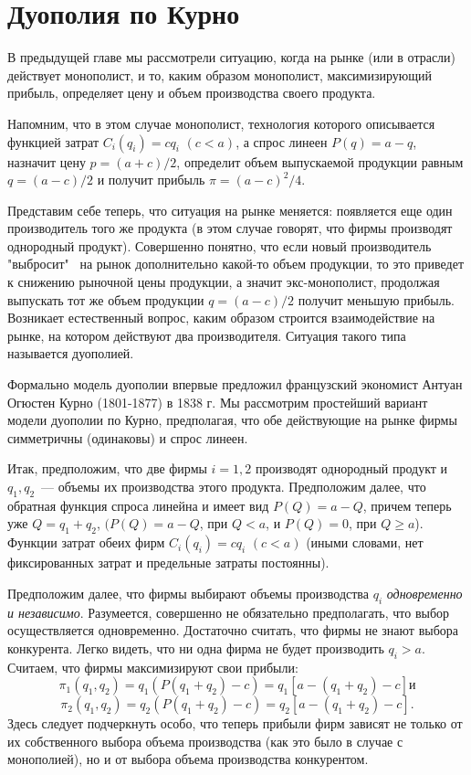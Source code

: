 \section{Дуополия по Курно}

В предыдущей главе мы рассмотрели ситуацию, когда на рынке (или в
отрасли) действует монополист, и то, каким образом монополист,
максимизирующий прибыль, определяет цену и объем
производства своего продукта.

Напомним, что в этом случае монополист, технология которого
описывается функцией затрат $C_i(q_i)=cq_i$ $(c<a)$, а спрос линеен
$P(q)=a-q$, назначит цену $p=(a+c)/2$, определит объем выпускаемой
продукции равным $q=(a-c)/2$ и получит прибыль $\pi = (a-c)^2/4$.

Представим себе теперь, что ситуация на рынке меняется: появляется
еще один производитель того же продукта (в этом случае говорят, что
фирмы производят однородный продукт). Совершенно понятно, что если
новый производитель "выбросит" \, на рынок дополнительно какой-то объем
продукции, то это приведет к снижению рыночной цены продукции, а
значит экс-монополист, продолжая выпускать тот же объем продукции
$q=(a-c)/2$ получит меньшую прибыль. Возникает естественный вопрос,
каким образом строится взаимодействие на рынке, на котором действуют
два производителя. Ситуация такого типа называется дуополией.

Формально модель дуополии впервые предложил французский экономист
Антуан Огюстен Курно (1801-1877) в 1838 г. Мы рассмотрим простейший
вариант модели дуополии по Курно, предполагая, что обе действующие
на рынке фирмы симметричны (одинаковы) и спрос линеен.

Итак, предположим, что две фирмы $i=1,2$ производят однородный
продукт и $q_1,q_2$~---  объемы их производства этого продукта.
Предположим далее, что обратная функция спроса линейна и имеет вид
$P(Q)=a-Q$, причем теперь уже $Q=q_1+q_2$,
$(P(Q)=a-Q$, при $Q<a$, и $P(Q)=0$, при $Q\ge a$). Функции затрат
обеих фирм $C_i(q_i)=cq_i$ $(c<a)$ (иными словами, нет фиксированных
затрат и предельные затраты постоянны).

Предположим далее, что фирмы выбирают объемы производства $q_i$ {\it
одновременно и независимо}. Разумеется, совершенно не обязательно
предполагать, что выбор осуществляется одновременно. Достаточно
считать, что фирмы не знают выбора конкурента. Легко видеть, что
ни одна фирма не будет производить $q_i>a$. Считаем, что фирмы
максимизируют свои прибыли:
$$
\pi_1(q_1,q_2)=q_1(P(q_1+q_2)-c)=q_1[a-(q_1+q_2)-c] \text{и}
$$
$$
\pi_2(q_1,q_2)=q_2(P(q_1+q_2)-c)=q_2[a-(q_1+q_2)-c].
$$
Здесь следует подчеркнуть особо, что теперь прибыли фирм зависят не
только от их собственного выбора объема производства (как это было в
случае с монополией), но и от выбора объема производства
конкурентом.


